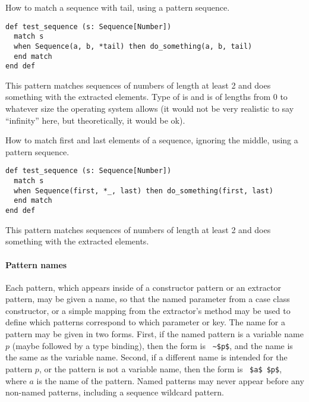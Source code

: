 \example How to match a sequence with tail, using a pattern sequence.
\begin{lstlisting}
def test_sequence (s: Sequence[Number])
  match s 
  when Sequence(a, b, *tail) then do_something(a, b, tail)
  end match
end def
\end{lstlisting}
This pattern matches sequences of numbers of length at least 2 and does something with the extracted elements. Type of  is  and is of lengths from 0 to whatever size the operating system allows (it would not be very realistic to say ``infinity'' here, but theoretically, it would be ok). 

\example How to match first and last elements of a sequence, ignoring the middle, using a pattern sequence.
\begin{lstlisting}
def test_sequence (s: Sequence[Number])
  match s 
  when Sequence(first, *_, last) then do_something(first, last)
  end match
end def
\end{lstlisting}
This pattern matches sequences of numbers of length at least 2 and does something with the extracted elements. 

\paragraph{Pattern names}
Each pattern, which appears inside of a constructor pattern or an extractor pattern, may be given a name, so that the named parameter from a case class constructor, or a simple mapping from the extractor's  method may be used to define which patterns correspond to which parameter or key. The name for a pattern may be given in two forms. First, if the named pattern is a variable name $p$ (maybe followed by a type binding), then the form is ~\lstinline!~$p$!, and the name is the same as the variable name. Second, if a different name is intended for the pattern $p$, or the pattern is not a variable name, then the form is ~\lstinline!$a$ $p$!, where $a$ is the name of the pattern. Named patterns may never appear before any non-named patterns, including a sequence wildcard pattern. 

